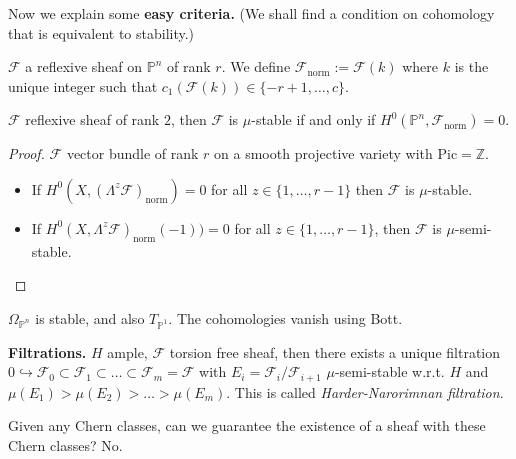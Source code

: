 Now we explain some {\bf easy criteria.} (We shall find a
condition on cohomology that is equivalent to stability.)

\begin{definition}
\label{definition-norm-sheaf}
$\mathcal{F}$ a reflexive sheaf on $\mathbb{P}^n$ of rank $r$. We define
$\mathcal{F}_{\text{norm}}:=\mathcal{F}(k)$ where $k$ is the unique integer such
that $c_1(\mathcal{F}(k))\in \{-r+1,\ldots,c\}$.
\end{definition}

\begin{proposition}
\label{proposition-cohomological-characterization-of-stability}
$\mathcal{F}$ reflexive sheaf of rank  $2$, then $\mathcal{F}$ is $\mu$-stable
if and only if $H^{0}(\mathbb{P}^n,\mathcal{F}_{\text{norm}})=0$.
\end{proposition}

\begin{proof}
$\mathcal{F}$ vector bundle of rank $r$ on a smooth projective variety with
$\text{Pic}=\mathbb{Z}$.
\begin{itemize}
\item If $H^{0}(X,(\Lambda^{z}\mathcal{F})_{\text{norm}})=0$ for all $z \in
\{1,\ldots,r-1\}$ then $\mathcal{F}$ is $\mu$-stable.
\item If $H^{0}(X,\Lambda^{z}\mathcal{F})_{\text{norm}}(-1))=0$ for all $z \in
\{1,\ldots,r-1\}$, then $\mathcal{F}$ is $\mu$-semi-stable.
\end{itemize}
\end{proof}

\begin{example}
\label{example-Omega1-on-projective-space-is-stable}
$\Omega_{\mathbb{P}^n}$ is stable, and also $T_{\mathbb{P}^1}$. The cohomologies
vanish using Bott.
\end{example}

\begin{example}
\label{example-lots-of-Os}

\end{example}

{\bf Filtrations.} $H$ ample, $\mathcal{F}$ torsion free sheaf, then there
exists a unique filtration $0 \hookrightarrow  \mathcal{F}_0\subset
\mathcal{F}_1\subset\ldots\subset\mathcal{F}_m=\mathcal{F}$ with
$E_i=\mathcal{F}_i/\mathcal{F}_{i+1}$ $\mu$-semi-stable w.r.t. $H$ and
$\mu(E_1)>\mu(E_2)>\ldots>\mu(E_m)$. This is called {\it Harder-Narorimnan
filtration}.

Given any Chern classes, can we guarantee the existence of a sheaf with these
Chern classes? No.

